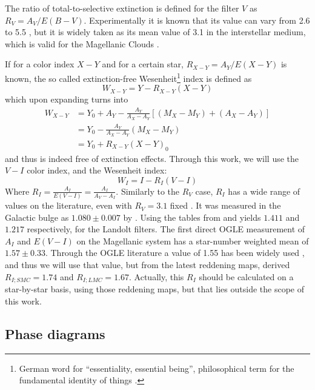 	The ratio of total-to-selective extinction is defined for the filter $V$ as $R_V = A_V/E(B-V)$. 
	Experimentally it is known that its value can vary from 2.6 to 5.5 \citep{Clayton1988},
	but it is widely taken as its mean value of 3.1 in the interstellar medium, which is valid for the Magellanic Clouds \citep{Cardelli1989,Gorski2020}.
	
	If for a color index $X-Y$ and for a certain star, $R_{X-Y} = A_Y/E(X-Y)$ is known, 
	the so called extinction-free Wesenheit\footnote{
		German word for \enquote{essentiality, essential being}, 
		philosophical term for the fundamental identity of things \citep[page 341]{German1997}.
	}
	index \citep{Madore1982} is defined as
	\begin{equation}
		W_{X-Y} = Y - R_{X-Y} (X-Y) \label{eq:wesenheit}
	\end{equation}
	which upon expanding turns into
	\begin{align*}
		W_{X-Y} &= Y_0 + A_Y - \frac{A_Y}{A_X - A_Y}[ (M_X-M_Y) + (A_X - A_Y) ] \\ 
		&= Y_0 - \frac{A_Y}{A_X - A_Y} (M_X-M_Y)  \\ 
		&= Y_0 + R_{X-Y}(X-Y)_0 
	\end{align*}
	and thus is indeed free of extinction effects. Through this work, we will use the $V-I$ color index, and the Wesenheit index:
	$$
	W_I = I - R_I (V-I)
	$$
	Where $R_I = \frac{A_I}{E(V-I)} = \frac{A_I}{A_V - A_I}$. 
	Similarly to the $R_V$ case, $R_I$ has a wide range of values on the literature, even with $R_V=3.1$ fixed \citep[for a discussion see][]{Nataf2015}. 
	It was measured in the Galactic bulge as $1.080\pm0.007$ by \cite{Pietrukowicz2012}. 
	Using the tables from \cite{Schlegel1998} and \cite{Schlafly2011} yields $1.411$ and $1.217$ respectively, for the Landolt filters.
	The first direct OGLE measurement of $A_I$ and $E(V-I)$ on the Magellanic system has a star-number weighted mean of $1.57\pm0.33$.
	Through the OGLE literature a value of 1.55 has been widely used \citep[see for instance][]{OGLE2015,Udalski1999,Ulaczyk2013},
	and thus we will use that value,
	but from the latest reddening maps, \cite{Reddening2021} derived $R_{I;SMC}=1.74$ and $R_{I;LMC}=1.67$.
	Actually, this $R_I$ should be calculated on a star-by-star basis, using those reddening maps,
	but that lies outside the scope of this work.
	
\subsection{Phase diagrams}

